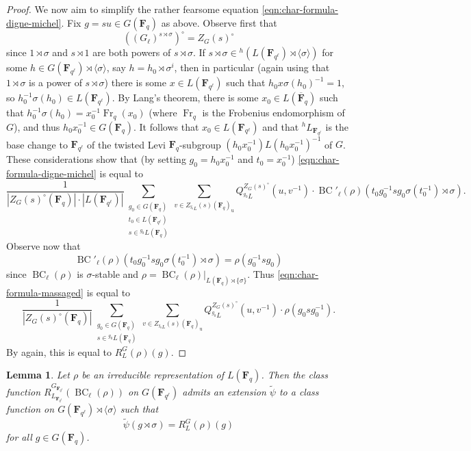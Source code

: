 \documentclass[11pt,reqno]{amsart}
\newtheorem{lemma}[theorem]{Lemma}
\theoremstyle{definition}
\newcommand{\F}{{\mathbf F}}
\DeclareMathOperator{\BC}{BC}
\DeclareMathOperator{\Fr}{Fr}
\newcommand{\ol}[1]{\overline{#1}}
\begin{document}
\begin{proof}
    We now aim to simplify the rather fearsome equation \eqref{eqn:char-formula-digne-michel}. Fix $g = su \in G(\F_q)$ as above. Observe first that
    \[
    ((G_\ell)^{s\rtimes\sigma})^\circ = Z_G(s)^\circ
    \]
    since $1 \rtimes \sigma$ and $s \rtimes 1$ are both powers of $s \rtimes \sigma$. If $s \rtimes\sigma \in {}^h(L(\F_{q^\ell}) \rtimes \langle\sigma\rangle)$ for some $h \in G(\F_{q^\ell}) \rtimes \langle\sigma\rangle$, say $h = h_0 \rtimes \sigma^i$, then in particular (again using that $1 \rtimes \sigma$ is a power of $s \rtimes \sigma$) there is some $x \in L(\F_{q^\ell})$ such that $h_0x\sigma(h_0)^{-1} = 1$, so $h_0^{-1}\sigma(h_0) \in L(\F_{q^\ell})$. By Lang's theorem, there is some $x_0 \in L(\ol\F_q)$ such that $h_0^{-1}\sigma(h_0) = x_0^{-1}\Fr_q(x_0)$ (where $\Fr_q$ is the Frobenius endomorphism of $G$), and thus $h_0x_0^{-1} \in G(\F_q)$. It follows that $x_0 \in L(\F_{q^\ell})$ and that $^hL_{\F_{q^\ell}}$ is the base change to $\F_{q^\ell}$ of the twisted Levi $\F_q$-subgroup $(h_0x_0^{-1})L (h_0x_0^{-1})^{-1}$ of $G$. These considerations show that (by setting $g_0 = h_0x_0^{-1}$ and $t_0 = x_0^{-1}$) \eqref{eqn:char-formula-digne-michel} is equal to
    \begin{equation}\label{eqn:char-formula-massaged}
    \frac{1}{|Z_G(s)^\circ(\F_q)| \cdot |L(\F_{q^\ell})|} \sum_{\substack{g_0 \in G(\F_q) \\ t_0 \in L(\F_{q^\ell}) \\ s \in {}^{g_0}L(\F_q)}} \sum_{v \in Z_{^{g_0}L}(s)(\F_q)_{\mathrm{u}}} Q_{^{g_0}L}^{Z_G(s)^\circ}(u, v^{-1}) \cdot \BC'_\ell(\rho)(t_0g_0^{-1}s g_0\sigma(t_0^{-1}) \rtimes \sigma).
    \end{equation}
    Observe now that
    \[
    \BC'_\ell(\rho)(t_0g_0^{-1}s g_0\sigma(t_0^{-1}) \rtimes \sigma) = \rho(g_0^{-1}sg_0)
    \]
    since $\BC_\ell(\rho)$ is $\sigma$-stable and $\rho = \BC_\ell(\rho)|_{L(\F_q) \rtimes \{\sigma\}}$. Thus \eqref{eqn:char-formula-massaged} is equal to
    \[
    \frac{1}{|Z_G(s)^\circ(\F_q)|} \sum_{\substack{g_0 \in G(\F_q) \\ s \in {}^{g_0}L(\F_q)}} \sum_{v \in Z_{^{g_0}L}(s)(\F_q)_{\mathrm{u}}} Q_{^{g_0}L}^{Z_G(s)^\circ}(u, v^{-1}) \cdot \rho(g_0sg_0^{-1}).
    \]
    By \cite[Proposition 2.6]{DM94} again, this is equal to $R_L^G(\rho)(g)$.
\end{proof}

\begin{lemma}\label{lemma:psi-tilde}
    Let $\rho$ be an irreducible representation of $L(\F_q)$. Then the class function $R_{L_{\F_{q^\ell}}}^{G_{\F_{q^\ell}}}(\BC_\ell(\rho))$ on $G(\F_{q^\ell})$ admits an extension $\widetilde\psi$ to a class function on $G(\F_{q^\ell}) \rtimes \langle\sigma\rangle$ such that
    \[
    \widetilde\psi(g \rtimes \sigma) = R_L^G(\rho)(g)
    \]
    for all $g \in G(\F_q)$.
\end{lemma}
\end{document}
